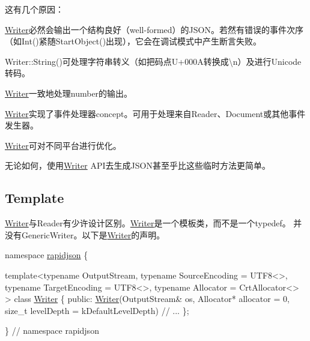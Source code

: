 这有几个原因：
\begin{DoxyEnumerate}
\item {\ttfamily \hyperlink{class_writer}{Writer}}必然会输出一个结构良好（well-\/formed）的\+J\+S\+O\+N。若然有错误的事件次序（如{\ttfamily Int()}紧随{\ttfamily Start\+Object()}出现），它会在调试模式中产生断言失败。
\item {\ttfamily Writer\+::\+String()}可处理字符串转义（如把码点{\ttfamily U+000A}转换成{\ttfamily \textbackslash{}n}）及进行\+Unicode转码。
\item {\ttfamily \hyperlink{class_writer}{Writer}}一致地处理number的输出。
\item {\ttfamily \hyperlink{class_writer}{Writer}}实现了事件处理器concept。可用于处理来自{\ttfamily Reader}、{\ttfamily Document}或其他事件发生器。
\item {\ttfamily \hyperlink{class_writer}{Writer}}可对不同平台进行优化。
\end{DoxyEnumerate}

无论如何，使用{\ttfamily \hyperlink{class_writer}{Writer}} A\+P\+I去生成\+J\+S\+O\+N甚至乎比这些临时方法更简单。\hypertarget{md_Cadriciel_Commun_Externe_RapidJSON_doc_sax.zh-cn_WriterTemplate}{}\subsection{Template}\label{md_Cadriciel_Commun_Externe_RapidJSON_doc_sax.zh-cn_WriterTemplate}
{\ttfamily \hyperlink{class_writer}{Writer}}与{\ttfamily Reader}有少许设计区别。{\ttfamily \hyperlink{class_writer}{Writer}}是一个模板类，而不是一个typedef。 并没有{\ttfamily Generic\+Writer}。以下是{\ttfamily \hyperlink{class_writer}{Writer}}的声明。


\begin{DoxyCode}
\textcolor{keyword}{namespace }\hyperlink{namespacerapidjson}{rapidjson} \{

\textcolor{keyword}{template}<\textcolor{keyword}{typename} OutputStream, \textcolor{keyword}{typename} SourceEncoding = UTF8<>, \textcolor{keyword}{typename} TargetEncoding = UTF8<>, \textcolor{keyword}{
      typename} Allocator = CrtAllocator<> >
\textcolor{keyword}{class }\hyperlink{class_writer}{Writer} \{
\textcolor{keyword}{public}:
    \hyperlink{class_writer}{Writer}(OutputStream& os, Allocator* allocator = 0, \textcolor{keywordtype}{size\_t} levelDepth = kDefaultLevelDepth)
\textcolor{comment}{// ...}
\};

\} \textcolor{comment}{// namespace rapidjson}
\end{DoxyCode}


